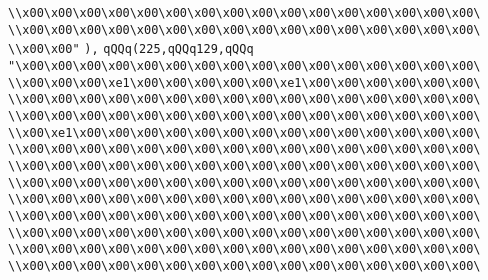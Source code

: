 \verb|\\x00\x00\x00\x00\x00\x00\x00\x00\x00\x00\x00\x00\x00\x00\x00\x00\|\newline
\verb|\\x00\x00\x00\x00\x00\x00\x00\x00\x00\x00\x00\x00\x00\x00\x00\x00\|\newline
\verb|\\x00\x00"|\newline
\verb|),|\newline
\verb|qQQq(225,qQQq129,qQQq|\newline
\verb|"\x00\x00\x00\x00\x00\x00\x00\x00\x00\x00\x00\x00\x00\x00\x00\x00\|\newline
\verb|\\x00\x00\x00\xe1\x00\x00\x00\x00\x00\xe1\x00\x00\x00\x00\x00\x00\|\newline
\verb|\\x00\x00\x00\x00\x00\x00\x00\x00\x00\x00\x00\x00\x00\x00\x00\x00\|\newline
\verb|\\x00\x00\x00\x00\x00\x00\x00\x00\x00\x00\x00\x00\x00\x00\x00\x00\|\newline
\verb|\\x00\xe1\x00\x00\x00\x00\x00\x00\x00\x00\x00\x00\x00\x00\x00\x00\|\newline
\verb|\\x00\x00\x00\x00\x00\x00\x00\x00\x00\x00\x00\x00\x00\x00\x00\x00\|\newline
\verb|\\x00\x00\x00\x00\x00\x00\x00\x00\x00\x00\x00\x00\x00\x00\x00\x00\|\newline
\verb|\\x00\x00\x00\x00\x00\x00\x00\x00\x00\x00\x00\x00\x00\x00\x00\x00\|\newline
\verb|\\x00\x00\x00\x00\x00\x00\x00\x00\x00\x00\x00\x00\x00\x00\x00\x00\|\newline
\verb|\\x00\x00\x00\x00\x00\x00\x00\x00\x00\x00\x00\x00\x00\x00\x00\x00\|\newline
\verb|\\x00\x00\x00\x00\x00\x00\x00\x00\x00\x00\x00\x00\x00\x00\x00\x00\|\newline
\verb|\\x00\x00\x00\x00\x00\x00\x00\x00\x00\x00\x00\x00\x00\x00\x00\x00\|\newline
\verb|\\x00\x00\x00\x00\x00\x00\x00\x00\x00\x00\x00\x00\x00\x00\x00\x00\|\newline

